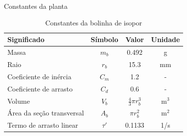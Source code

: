 \documentclass[10pt]{beamer}
\begin{document}
\begin{frame}[fragile]{Constantes da planta}

\begin{block}{}
\begin{table}[!ht]
	\centering
	\caption{Constantes da bolinha de isopor\label{constanteIsopor}}
	\begin{tabular}{|l|c|c|c|}
		\hline
		\textbf{Significado} & \textbf{Símbolo} & \textbf{Valor} & \textbf{Unidade}\\ \hline \hline
		Massa & $m_{b}$ & 0.492 & g\\ \hline
		Raio & $r_{b}$ & 15.3 & mm\\ \hline
		Coeficiente de inércia & $C_m$ & 1.2 & - \\ \hline
		Coeficiente de arrasto & $C_d$ & 0.6 & - \\ \hline
		Volume & $V_b$ & $\frac{4}{3}\pi r_b^3$ & $\textrm{m}^3$ \\ \hline
		Área da seção transversal & $A_b$ & $\pi r_b^2$ & m$^2$\\ \hline
		Termo de arrasto linear & $\tau'$ & 0.1133 & 1/s\\ \hline
	\end{tabular}
	
\end{table}

\end{block}	
\end{frame}
\end{document}
